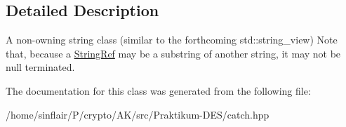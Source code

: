 \subsection{Detailed Description}
A non-\/owning string class (similar to the forthcoming std\+::string\+\_\+view) Note that, because a \hyperlink{classCatch_1_1StringRef}{String\+Ref} may be a substring of another string, it may not be null terminated. 

The documentation for this class was generated from the following file\+:\begin{DoxyCompactItemize}
\item 
/home/sinflair/\+P/crypto/\+A\+K/src/\+Praktikum-\/\+D\+E\+S/catch.\+hpp\end{DoxyCompactItemize}
